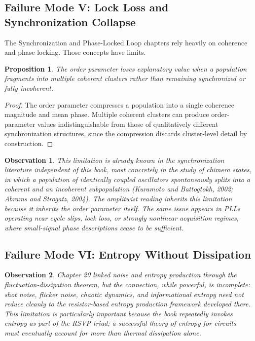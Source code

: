 \documentclass[12pt]{article}
\newtheorem{proposition}{Proposition}
\newtheorem{observation}{Observation}
\begin{document}
\subsection{Failure Mode V: Lock Loss and Synchronization Collapse}

The Synchronization and Phase-Locked Loop chapters rely heavily on coherence and phase locking. Those concepts have limits.

\begin{proposition}
The order parameter loses explanatory value when a population fragments into multiple coherent clusters rather than remaining synchronized or fully incoherent.
\end{proposition}

\begin{proof}
The order parameter compresses a population into a single coherence magnitude and mean phase. Multiple coherent clusters can produce order-parameter values indistinguishable from those of qualitatively different synchronization structures, since the compression discards cluster-level detail by construction.
\end{proof}

\begin{observation}
This limitation is already known in the synchronization literature independent of this book, most concretely in the study of chimera states, in which a population of identically coupled oscillators spontaneously splits into a coherent and an incoherent subpopulation (Kuramoto and Battogtokh, 2002; Abrams and Strogatz, 2004). The amplitwist reading inherits this limitation because it inherits the order parameter itself. The same issue appears in PLLs operating near cycle slips, lock loss, or strongly nonlinear acquisition regimes, where small-signal phase descriptions cease to be sufficient.
\end{observation}

\subsection{Failure Mode VI: Entropy Without Dissipation}

\begin{observation}
Chapter 20 linked noise and entropy production through the fluctuation-dissipation theorem, but the connection, while powerful, is incomplete: shot noise, flicker noise, chaotic dynamics, and informational entropy need not reduce cleanly to the resistor-based entropy production framework developed there. This limitation is particularly important because the book repeatedly invokes entropy as part of the RSVP triad; a successful theory of entropy for circuits must eventually account for more than thermal dissipation alone.
\end{observation}
\end{document}
